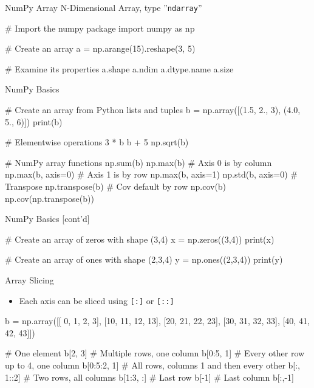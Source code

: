 \documentclass[ignorenonframetext,xcolor=x11names]{beamer}
\begin{document}
\begin{frame}[label=full,fragile]{NumPy Array}
N-Dimensional Array, type ''\texttt{ndarray}'' \\

\begin{pythoncode}
# Import the numpy package
import numpy as np

# Create an array
a = np.arange(15).reshape(3, 5)

# Examine its properties
a.shape
a.ndim
a.dtype.name
a.size
\end{pythoncode}
\end{frame}

\begin{frame}[label=full,fragile]{NumPy Basics}

\begin{pythoncode}
# Create an array from Python lists and tuples
b = np.array([(1.5, 2., 3), 
              (4.0, 5., 6)])
print(b)

# Elementwise operations
3 * b
b + 5
np.sqrt(b)

# NumPy array functions
np.sum(b)
np.max(b)
# Axis 0 is by column
np.max(b, axis=0)
# Axis 1 is by row
np.max(b, axis=1)
np.std(b, axis=0)
# Transpose
np.transpose(b)
# Cov default by row
np.cov(b)
np.cov(np.transpose(b))
\end{pythoncode}
\end{frame}

\begin{frame}[label=full,fragile]{NumPy Basics \small [cont'd]}

\begin{pythoncode}
# Create an array of zeros with shape (3,4)
x = np.zeros((3,4))
print(x)

# Create an array of ones with shape (2,3,4)
y = np.ones((2,3,4))
print(y)
\end{pythoncode}
\end{frame}

\begin{frame}[label=full,fragile]{Array Slicing}
\begin{itemize}
    \item Each axis can be sliced using \texttt{[:]} or \texttt{[::]}
\end{itemize}

\begin{pythoncode}
b = np.array([[ 0,  1,  2,  3],
              [10, 11, 12, 13],
              [20, 21, 22, 23],
              [30, 31, 32, 33],
              [40, 41, 42, 43]])

# One element              
b[2, 3]
# Multiple rows, one column
b[0:5, 1]
# Every other row up to 4, one column
b[0:5:2, 1]
# All rows, columns 1 and then every other
b[:, 1::2]
# Two rows, all columns
b[1:3, :]
# Last row
b[-1]
# Last column
b[:,-1]
\end{pythoncode}
\end{frame}
\end{document}
